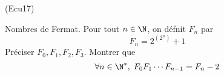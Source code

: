 \begin{tiny}(Ecu17)\end{tiny} Nombres de Fermat.\newline
Pour tout $n\in \N$, on défnit $F_n$ par
\begin{displaymath}
  F_n = 2^{(2^{n})}+1
\end{displaymath}
Préciser $F_0, F_1, F_2, F_3$. Montrer que
\begin{displaymath}
  \forall n \in \N^*,\;
  F_0 F_1 \cdots F_{n-1} = F_n -2
\end{displaymath}


